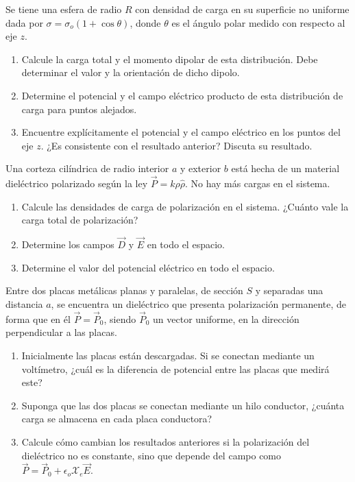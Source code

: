 Se tiene una esfera de radio $R$ con densidad de carga en su superficie no uniforme dada por $\sigma = \sigma_o(1 + \cos{\theta})$, donde $\theta$ es el ángulo polar medido con respecto al eje $z$.

\begin{enumerate}[label=\alph*)]
    \item Calcule la carga total y el momento dipolar de esta distribución. Debe determinar el valor y la orientación de dicho dipolo.
    \item Determine el potencial y el campo eléctrico producto de esta distribución de carga para puntos alejados.
    \item Encuentre explícitamente el potencial y el campo eléctrico en los puntos del eje $z$. ¿Es consistente con el resultado anterior? Discuta su resultado.
\end{enumerate}
\bigbreak

\np

Una corteza cilíndrica de radio interior $a$ y exterior $b$ está hecha de un material dieléctrico polarizado según la ley $\Vec{P} = k\rho\hat{\rho}$. No hay más cargas en el sistema.

\begin{enumerate}[label=\alph*)]
    \item Calcule las densidades de carga de polarización en el sistema. ¿Cuánto vale la carga total de polarización?
    \item Determine los campos $\Vec{D}$ y $\Vec{E}$ en todo el espacio.
    \item Determine el valor del potencial eléctrico en todo el espacio.
\end{enumerate}

\bigbreak

\np

Entre dos placas metálicas planas y paralelas, de sección $S$ y separadas una distancia $a$, se encuentra un dieléctrico que presenta polarización permanente, de forma que en él $\Vec{P} = \Vec{P}_0$, siendo $\Vec{P}_0$ un vector uniforme, en la dirección perpendicular a las placas.

\begin{enumerate}[label=\alph*)]
    \item Inicialmente las placas están descargadas. Si se conectan mediante un voltímetro, ¿cuál es la diferencia de potencial entre las placas que medirá este?
    \item  Suponga que las dos placas se conectan mediante un hilo conductor, ¿cuánta carga se almacena en cada placa conductora?
    \item Calcule cómo cambian los resultados anteriores si la polarización del dieléctrico no es constante, sino que depende del campo como $\Vec{P} = \Vec{P}_0 + \epsilon_o
    \mathcal{X}_e\Vec{E}$.
\end{enumerate}

